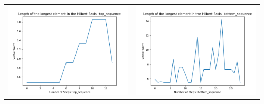 \documentclass[10pt]{article}
\begin{document}
\begin{tabular}{c|c}
\begin{minipage}{.45\textwidth}
\includegraphics[width=\textwidth]{"DATA/5d/6 generators 2 bound D/top_sequence LENGTH"}
\end{minipage} &
\begin{minipage}{.45\textwidth}
\includegraphics[width=\textwidth]{"DATA/5d/6 generators 2 bound D bottomup/bottom_sequence LENGTH"}
\end{minipage}
\end{tabular}
\end{document}
